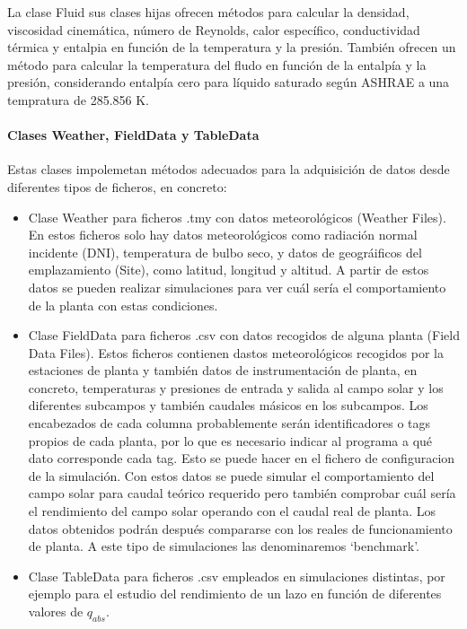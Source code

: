 \documentclass[11pt]{article}
\providecommand{\tightlist}{%
      \setlength{\itemsep}{0pt}\setlength{\parskip}{0pt}}
\begin{document}
La clase Fluid sus clases hijas ofrecen métodos para calcular la
densidad, viscosidad cinemática, número de Reynolds, calor específico,
conductividad térmica y entalpia en función de la temperatura y la
presión. También ofrecen un método para calcular la temperatura del
fludo en función de la entalpía y la presión, considerando entalpía cero
para líquido saturado según ASHRAE a una tempratura de 285.856 K.

\hypertarget{clases-weather-fielddata-y-tabledata}{%
\paragraph{Clases Weather, FieldData y
TableData}\label{clases-weather-fielddata-y-tabledata}}

Estas clases impolemetan métodos adecuados para la adquisición de datos
desde diferentes tipos de ficheros, en concreto:

\begin{itemize}
\tightlist
\item
  Clase Weather para ficheros .tmy con datos meteorológicos (Weather
  Files). En estos ficheros solo hay datos meteorológicos como radiación
  normal incidente (DNI), temperatura de bulbo seco, y datos de
  geográificos del emplazamiento (Site), como latitud, longitud y
  altitud. A partir de estos datos se pueden realizar simulaciones para
  ver cuál sería el comportamiento de la planta con estas condiciones.
\item
  Clase FieldData para ficheros .csv con datos recogidos de alguna
  planta (Field Data Files). Estos ficheros contienen dastos
  meteorológicos recogidos por la estaciones de planta y también datos
  de instrumentación de planta, en concreto, temperaturas y presiones de
  entrada y salida al campo solar y los diferentes subcampos y también
  caudales másicos en los subcampos. Los encabezados de cada columna
  probablemente serán identificadores o tags propios de cada planta, por
  lo que es necesario indicar al programa a qué dato corresponde cada
  tag. Esto se puede hacer en el fichero de configuracion de la
  simulación. Con estos datos se puede simular el comportamiento del
  campo solar para caudal teórico requerido pero también comprobar cuál
  sería el rendimiento del campo solar operando con el caudal real de
  planta. Los datos obtenidos podrán después compararse con los reales
  de funcionamiento de planta. A este tipo de simulaciones las
  denominaremos `benchmark'.
\item
  Clase TableData para ficheros .csv empleados en simulaciones
  distintas, por ejemplo para el estudio del rendimiento de un lazo en
  función de diferentes valores de \(q_{abs}\).
\end{itemize}
\end{document}
